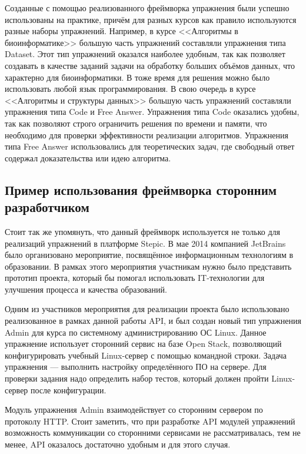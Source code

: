 \documentclass{matmex-diploma-custom}
\begin{document}
Созданные с помощью реализованного фреймворка упражнения были успешно
использованы на практике, причём для разных курсов как правило
используются разные наборы упражнений. Например, в курсе <<Алгоритмы в
биоинформатике>> большую часть упражнений составляли упражнения типа
Dataset. Этот тип упражнений оказался наиболее удобным, так как
позволяет создавать в качестве заданий задачи на обработку больших
объёмов данных, что характерно для биоинформатики. В тоже время для
решения можно было использовать любой язык программирования. В свою
очередь в курсе <<Алгоритмы и структуры данных>> большую часть
упражнений составляли упражнения типа Code и Free Answer. Упражнения
типа Code оказались удобны, так как позволяют строго ограничить
решения по времени и памяти, что необходимо для проверки эффективности
реализации алгоритмов. Упражнения типа Free Answer использовались для
теоретических задач, где свободный ответ содержал доказательства или
идею алгоритма.

\subsection{Пример использования фреймворка сторонним разработчиком}

Стоит так же упомянуть, что данный фреймворк используется не только
для реализаций упражнений в платформе Stepic. В мае 2014 компанией
JetBrains было организовано мероприятие, посвящённое информационным
технологиям в образовании. В рамках этого мероприятия участникам нужно
было представить прототип проекта, который бы помогал использовать
IT-технологии для улучшения процесса и качества образований.

Одним из участников мероприятия для реализации проекта было
использовано реализованное в рамках данной работы API, и был создан
новый тип упражнения Admin для курса по системному администрированию
ОС Linux.  Данное упражнение использует сторонний сервис на базе Open
Stack, позволяющий конфигурировать учебный Linux-сервер с помощью
командной строки. Задача упражнения --- выполнить настройку
определённого ПО на сервере. Для проверки задания надо определить
набор тестов, который должен пройти Linux-сервер после конфигурации.

Модуль упражнения Admin взаимодействует со сторонним сервером по
протоколу HTTP. Стоит заметить, что при разработке API модулей
упражнений возможность коммуникации со сторонними сервисами не
рассматривалась, тем не менее, API оказалось достаточно удобным и для
этого случая.
\end{document}
